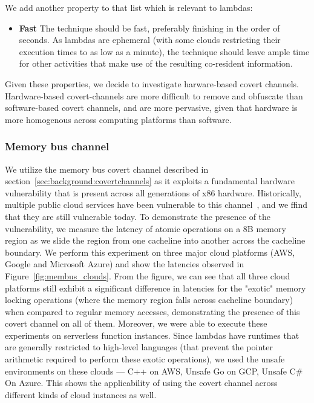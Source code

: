 \noindent We add another property to that list which is relevant to lambdas:
\begin{itemize}
    \item \textbf{Fast} The technique should be fast, preferably finishing in 
    the order of seconds. As lambdas are ephemeral (with some clouds restricting their 
    execution times to as low as a minute), the technique should leave ample time 
    for other activities that make use of the resulting co-resident information.
\end{itemize}

Given these properties, we decide to investigate harware-based covert channels.
Hardware-based covert-channels are more difficult to remove and obfuscate than
software-based covert channels, and are more pervasive, 
given that hardware is more homogenous across computing platforms than software. 

\subsubsection{Memory bus channel}
We utilize the memory bus covert channel described in
section~\ref{sec:background:covertchannels} as it exploits a fundamental
hardware vulnerability that is present across all generations of x86 hardware.
Historically, multiple public cloud services have been vulnerable to this
channel~\cite{varad191016,zhang2016}, and we ffind that they are still
vulnerable today. To demonstrate the presence of the vulnerability, we measure
the latency of atomic operations on a 8B memory region as we slide the region
from one cacheline into another across the cacheline boundary. We perform this
experiment on three major cloud platforms (AWS, Google and Microsoft Azure) and
show the latencies observed in Figure~\ref{fig:membus_clouds}. From the figure,
we can see that all three cloud platforms still exhibit a significant difference
in latencies for the "exotic" memory locking operations (where the memory region
falls across cacheline boundary) when compared to regular memory accesses,
demonstrating the presence of this covert channel on all of them. Moreover, we
were able to execute these experiments on serverless function instances. Since
lambdas have runtimes that are generally restricted to high-level languages
(that prevent the pointer arithmetic required to perform these exotic
operations), we used the unsafe environments on these clouds --- C++ on AWS,
Unsafe Go on GCP, Unsafe C\# On Azure. This shows the applicability of using the
covert channel across different kinds of cloud instances as well.


